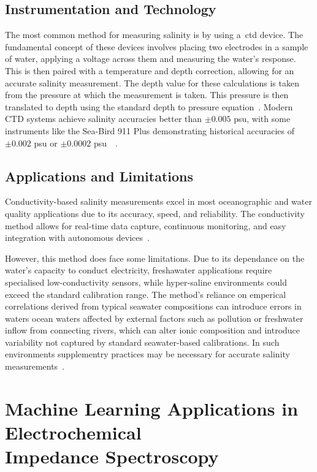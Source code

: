 \subsection{Instrumentation and Technology}
The most common method for measuring salinity is by using a~\gls{ctd} device.
The fundamental concept of these devices involves placing two electrodes in a sample of water, applying a voltage across them and measuring the water's response. This is then paired with a temperature and depth correction, allowing for an accurate salinity measurement.
The depth value for these calculations is taken from the pressure at which the measurement is taken.
This pressure is then translated to depth using the standard depth to pressure equation~\cite{chip_based_ctd}.
Modern CTD systems achieve salinity accuracies better than $\pm0.005$ \gls{psu}, with some instruments like the Sea-Bird 911 Plus demonstrating historical accuracies of $\pm0.002$ \gls{psu} or $\pm0.0002$ \gls{psu}~\cite{chip_based_ctd}~\cite{ctd_accuracy}.

\subsection{Applications and Limitations}
Conductivity-based salinity measurements excel in most oceanographic and water quality applications due to its accuracy, speed, and reliability.
The conductivity method allows for real-time data capture, continuous monitoring, and easy integration with autonomous devices~\cite{roemmich_argo_2009}. 

However, this method does face some limitations. Due to its dependance on the water's capacity to conduct electricity, freshawater applications require specialised low-conductivity sensors, while hyper-saline environments could exceed the standard calibration range.
The method's reliance on emperical correlations derived from typical seawater compositions can introduce errors in waters ocean waters affected by external factors such as pollution or freshwater inflow from connecting rivers, which can alter ionic composition and introduce variability not captured by standard seawater-based calibrations.
In such environments supplementry practices may be necessary for accurate salinity measurements~\cite{uncles_estuarine_2002}.

\section{Machine Learning Applications in Electrochemical \\ Impedance Spectroscopy}
